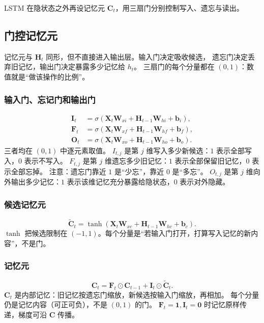 

LSTM 在隐状态之外再设记忆元 $\bm{C}_t$，用三扇门分别控制写入、遗忘与读出。

\subsection{门控记忆元}

记忆元与 $\bm{H}_t$ 同形，但不直接进入输出层。输入门决定吸收候选，
遗忘门决定丢弃旧记忆，输出门决定暴露多少记忆给 $h_t$。
三扇门的每个分量都在 $(0,1)$：数值就是“做该操作的比例”。

\subsubsection{输入门、忘记门和输出门}

\begin{align*}
\bm{I}_t
&=
\sigma(\bm{X}_t\bm{W}_{xi}+\bm{H}_{t-1}\bm{W}_{hi}+\bm{b}_i),
\\
\bm{F}_t
&=
\sigma(\bm{X}_t\bm{W}_{xf}+\bm{H}_{t-1}\bm{W}_{hf}+\bm{b}_f),
\\
\bm{O}_t
&=
\sigma(\bm{X}_t\bm{W}_{xo}+\bm{H}_{t-1}\bm{W}_{ho}+\bm{b}_o).
\end{align*}
三者均在 $(0,1)$ 中逐元素取值。
$I_{t,j}$ 是第 $j$ 维写入多少新候选：$1$ 表示全部写入，$0$ 表示不写入。
$F_{t,j}$ 是第 $j$ 维遗忘多少旧记忆：$1$ 表示全部保留旧记忆，$0$ 表示全部忘掉。
注意：遗忘门靠近 $1$ 是“少忘”，靠近 $0$ 是“多忘”。
$O_{t,j}$ 是第 $j$ 维向外输出多少记忆：$1$ 表示该维记忆充分暴露给隐状态，$0$ 表示对外隐藏。

\subsubsection{候选记忆元}

\[
\tilde{\bm{C}}_t
=
\tanh(\bm{X}_t\bm{W}_{xc}+\bm{H}_{t-1}\bm{W}_{hc}+\bm{b}_c).
\]
$\tanh$ 把候选限制在 $(-1,1)$。每个分量是“若输入门打开，打算写入记忆的新内容”，不是门。

\subsubsection{记忆元}

\[
\bm{C}_t
=
\bm{F}_t\odot\bm{C}_{t-1}+\bm{I}_t\odot\tilde{\bm{C}}_t.
\]
$\bm{C}_t$ 是内部记忆：旧记忆按遗忘门缩放，新候选按输入门缩放，再相加。
每个分量仍是记忆内容（可正可负），不是 $(0,1)$ 的门。
$\bm{F}_t=\bm{1},\bm{I}_t=\bm{0}$ 时记忆原样传递，梯度可沿 $\bm{C}$ 传播。

